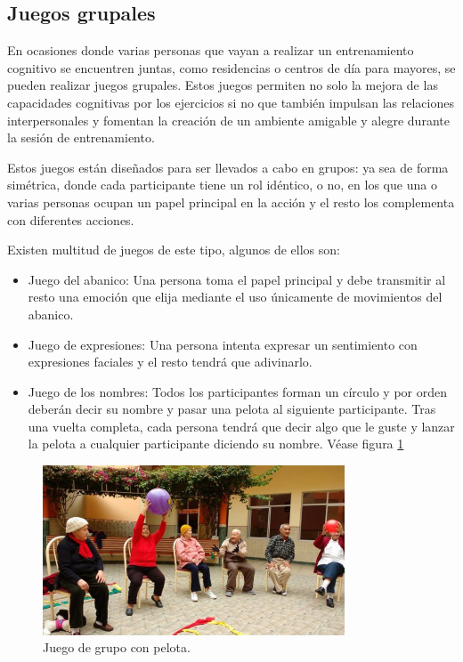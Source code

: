 \subsection{Juegos grupales}

En ocasiones donde varias personas que vayan a realizar un entrenamiento cognitivo se encuentren juntas, como residencias o centros de día para mayores, se pueden realizar juegos grupales. Estos juegos permiten no solo la mejora de las capacidades cognitivas por los ejercicios si no que también impulsan las relaciones interpersonales y fomentan la creación de un ambiente amigable y alegre durante la sesión de entrenamiento.

Estos juegos están diseñados para ser llevados a cabo en grupos: ya sea de forma simétrica, donde cada participante tiene un rol idéntico, o no, en los que una o varias personas ocupan un papel principal en la acción y el resto los complementa con diferentes acciones.

Existen multitud de juegos de este tipo, algunos de ellos son:

\begin{itemize}
	\item{Juego del abanico: Una persona toma el papel principal y debe transmitir al resto una emoción que elija mediante el uso únicamente de movimientos del abanico.}

	\item{Juego de expresiones: Una persona intenta expresar un sentimiento con expresiones faciales y el resto tendrá que adivinarlo.}

	\item{Juego de los nombres: Todos los participantes forman un círculo y por orden deberán decir su nombre y pasar una pelota al siguiente participante. Tras una vuelta completa, cada persona tendrá que decir algo que le guste y lanzar la pelota a cualquier participante diciendo su nombre. Véase figura \ref{fig:EA_juegosAncianos}}

\end{itemize}


\begin{figure}
  \centering
\includegraphics[width=0.8\textwidth]{03.EstudioProblema/01.EstadoArte/00.Figuras/04.juegos_ancianos.jpg}
    \caption{Juego de grupo con pelota. \cite{EA_img_juegoGrupoPelota}}
    \label{fig:EA_juegosAncianos}
\end{figure}

